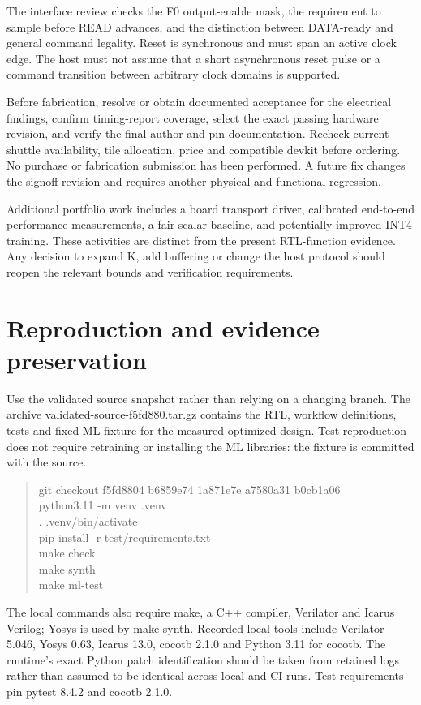 \documentclass[10pt,letterpaper]{article}
\begin{document}
The interface review checks the F0 output-enable mask, the requirement to sample before READ advances, and the distinction between DATA-ready and general command legality. Reset is synchronous and must span an active clock edge. The host must not assume that a short asynchronous reset pulse or a command transition between arbitrary clock domains is supported.

Before fabrication, resolve or obtain documented acceptance for the electrical findings, confirm timing-report coverage, select the exact passing hardware revision, and verify the final author and pin documentation. Recheck current shuttle availability, tile allocation, price and compatible devkit before ordering. No purchase or fabrication submission has been performed. A future fix changes the signoff revision and requires another physical and functional regression.

Additional portfolio work includes a board transport driver, calibrated end-to-end performance measurements, a fair scalar baseline, and potentially improved INT4 training. These activities are distinct from the present RTL-function evidence. Any decision to expand K, add buffering or change the host protocol should reopen the relevant bounds and verification requirements.

\clearpage
\section{Reproduction and evidence preservation}
Use the validated source snapshot rather than relying on a changing branch. The archive validated-source-f5fd880.tar.gz contains the RTL, workflow definitions, tests and fixed ML fixture for the measured optimized design. Test reproduction does not require retraining or installing the ML libraries: the fixture is committed with the source.

\begin{quote}\ttfamily\small git checkout f5fd8804 b6859e74 1a871e7e a7580a31 b0cb1a06\\
python3.11 -m venv .venv\\
. .venv/bin/activate\\
pip install -r test/requirements.txt\\
make check\\
make synth\\
make ml-test\end{quote}
The local commands also require make, a C++ compiler, Verilator and Icarus Verilog; Yosys is used by make synth. Recorded local tools include Verilator 5.046, Yosys 0.63, Icarus 13.0, cocotb 2.1.0 and Python 3.11 for cocotb. The runtime's exact Python patch identification should be taken from retained logs rather than assumed to be identical across local and CI runs. Test requirements pin pytest 8.4.2 and cocotb 2.1.0.
\end{document}
